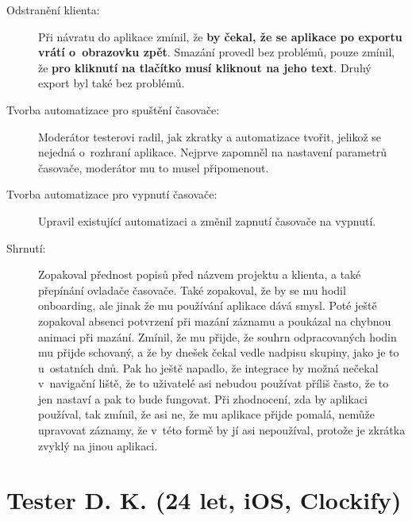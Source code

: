 \begin{description}
\item[Odstranění klienta:] Při návratu do aplikace zmínil, že \textbf{by čekal, že se aplikace po exportu vrátí o~obrazovku zpět}. Smazání provedl bez problémů, pouze zmínil, že \textbf{pro kliknutí na tlačítko musí kliknout na jeho text}. Druhý export byl také bez problémů.
\item[Tvorba automatizace pro spuštění časovače:] Moderátor testerovi radil, jak zkratky a automatizace tvořit, jelikož se nejedná o~rozhraní aplikace. Nejprve zapomněl na nastavení parametrů časovače, moderátor mu to musel připomenout.
\item[Tvorba automatizace pro vypnutí časovače:] Upravil existující automatizaci a změnil zapnutí časovače na vypnutí.
\item[Shrnutí:] Zopakoval přednost popisů před názvem projektu a klienta, a také přepínání ovladače časovače. Také zopakoval, že by se mu hodil onboarding, ale jinak že mu používání aplikace dává smysl. Poté ještě zopakoval absenci potvrzení při mazání záznamu a poukázal na chybnou animaci při mazání. Zmínil, že mu přijde, že souhrn odpracovaných hodin mu přijde schovaný, a že by dnešek čekal vedle nadpisu skupiny, jako je to u~ostatních dnů. Pak ho ještě napadlo, že integrace by možná nečekal v~navigační liště, že to uživatelé asi nebudou používat příliš často, že to jen nastaví a pak to bude fungovat. Při zhodnocení, zda by aplikaci používal, tak zmínil, že asi ne, že mu aplikace přijde pomalá, nemůže upravovat záznamy, že v~této formě by jí asi nepoužíval, protože je zkrátka zvyklý na jinou aplikaci.
\end{description}

\section*{Tester D. K. (24 let, iOS, Clockify)}\label{tester:dk}


